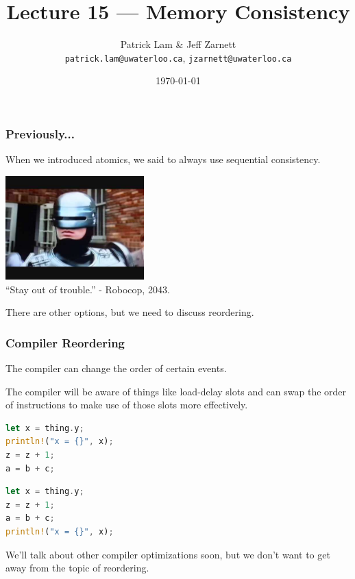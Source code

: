 

\title{Lecture 15 --- Memory Consistency}

\author{Patrick Lam \& Jeff Zarnett\\ \small \texttt{patrick.lam@uwaterloo.ca}, \texttt{jzarnett@uwaterloo.ca}}
\date{\today}




\begin{frame}
  \titlepage
 \end{frame}
 
 
\begin{frame}
\frametitle{Previously...}

When we introduced atomics, we said to always use sequential consistency.

\begin{center}
	\includegraphics[width=0.4\textwidth]{images/robocop.jpg}\\
	\hfill ``Stay out of trouble.'' - Robocop, 2043.
\end{center}

There are other options, but we need to discuss reordering.

\end{frame}



\begin{frame}[fragile]
\frametitle{Compiler Reordering}
The compiler can change the order of certain events. 

The compiler will be aware of things like load-delay slots and can swap the order of instructions to make use of those slots more effectively.

\begin{multicols}{2}
\begin{lstlisting}[language=Rust]
let x = thing.y;
println!("x = {}", x);
z = z + 1;
a = b + c;
\end{lstlisting}
\columnbreak
\begin{lstlisting}[language=Rust]
let x = thing.y;
z = z + 1;
a = b + c;
println!("x = {}", x);
\end{lstlisting}
\end{multicols}

We'll talk about other compiler optimizations soon, but we don't want to get away from the topic of reordering. 

\end{frame}


